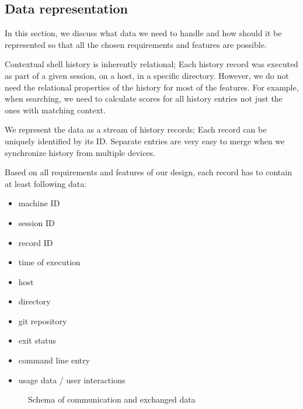 \subsection{Data representation}

In this section, we discuss what data we need to handle and how should it be represented so that all the chosen requirements and features are possible.


Contextual shell history is inherently relational; Each history record was executed as part of a given session, on a host, in a specific directory. However, we do not need the relational properties of the history for most of the features. For example, when searching, we need to calculate scores for all history entries not just the ones with matching context. 

We represent the data as a stream of history records; Each record can be uniquely identified by its ID. Separate entries are very easy to merge when we synchronize history from multiple devices.

Based on all requirements and features of our design, each record has to contain at least following data:
\begin{itemize}
    \item machine ID
    \item session ID
    \item record ID
    \item time of execution
    \item host
    \item directory
    \item git repository
    \item exit status
    \item command line entry
    \item usage data / user interactions
\end{itemize}



\begin{figure}
\centering
  \caption{Schema of communication and exchanged data}
  \label{design-api}
\end{figure}


